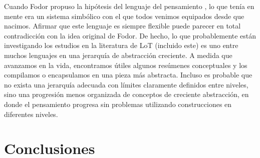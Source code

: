 Cuando Fodor propuso la hipótesis del lenguaje del pensamiento \cite{fodor1975language}, lo que tenía en mente era un sistema simbólico con el que todos venimos equipados desde que nacimos. Afirmar que este lenguaje es siempre flexible puede parecer en total contradicción con la idea original de Fodor. De hecho, lo que probablemente están investigando los estudios en la literatura de LoT (incluido este) es uno entre muchos lenguajes en una jerarquía de abstracción creciente. A medida que avanzamos en la vida, encontramos útiles algunos resúmenes conceptuales y los compilamos o encapsulamos en una pieza más abstracta. Incluso es probable que no exista una jerarquía adecuada con límites claramente definidos entre niveles, sino una progresión menos organizada de conceptos de creciente abstracción, en donde el pensamiento progresa sin problemas utilizando construcciones en diferentes niveles.

\section{Conclusiones}

